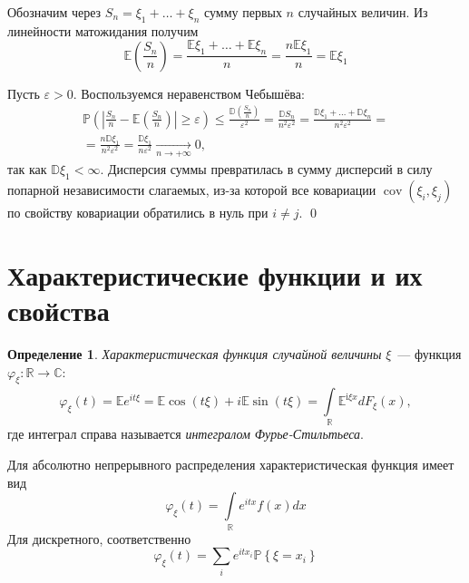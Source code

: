\documentclass[oneside,final,14pt]{extreport}
\renewenvironment{proof}{{\bfseries Доказательство.}}{\qed}
\theoremstyle{plain}
\theoremstyle{definition}
\newtheorem*{defn}{Определение}
\theoremstyle{named}
\begin{document}
\begin{proof}
    Обозначим через $S_n = \xi_1 + \ldots + \xi_n$ сумму первых $n$ случайных величин. Из линейности матожидания получим
    \begin{equation*}
        \mathbb{E}\left(\frac{S_{n}}{n}\right)=\frac{\mathbb{E} \xi_{1}+\ldots+\mathbb{E} \xi_{n}}{n}=\frac{n \mathbb{E} \xi_{1}}{n}=\mathbb{E} \xi_{1}
    \end{equation*}
    
    Пусть $\varepsilon > 0.$ Воспользуемся неравенством Чебышёва:
    \begin{multline*}
        \mathbb{P}\left(\left|\frac{S_{n}}{n}-\mathbb{E}\left(\frac{S_{n}}{n}\right)\right| \geqslant \varepsilon\right) \leqslant \frac{\mathbb{D}\left(\frac{S_{n}}{n}\right)}{\varepsilon^{2}}
        = \frac{\mathbb{D} S_{n}}{n^{2} \varepsilon^{2}}
        = \frac{\mathbb{D} \xi_{1}+\ldots+\mathbb{D} \xi_{n}}{n^{2} \varepsilon^{2}}= \\
        = \frac{n \mathbb{D} \xi_{1}}{n^{2} \varepsilon^{2}}
        = \frac{\mathbb{D} \xi_{1}}{n \varepsilon^{2}} \xrightarrow[n \to +\infty]{} 0,
    \end{multline*}
    так как $\mathbb{D}\xi_1 < \infty$. Дисперсия суммы превратилась в сумму дисперсий в силу попарной независимости слагаемых, из-за которой все ковариации $\operatorname{cov}(\xi_i, \xi_j)$ по свойству ковариации обратились в нуль при $i \neq j$.
\end{proof}

\section{Характеристические функции и их свойства}
\begin{defn}
    {\it Характеристическая функция случайной величины} $\xi$~--- функция $\varphi_{\xi}: \mathbb{R} \rightarrow \mathbb{C}$:
    \begin{equation*}
        \varphi_{\xi}(t)
        = \mathbb{E} e^{i t \xi}
        = \mathbb{E} \cos (t \xi)+i \mathbb{E} \sin (t \xi) = \int\limits_{\mathbb{R}}^{} \mathbb{E}^{\mathrm{i} \xi x} d F_{\xi}(x),
    \end{equation*}
    где интеграл справа называется {\it интегралом Фурье-Стильтьеса}.
    
    Для абсолютно непрерывного распределения характеристическая функция имеет вид
    \begin{equation*}
        \varphi_{\xi}(t)=\int\limits_{\mathbb{R}} e^{i t x} f(x) d x
    \end{equation*}
    Для дискретного, соответственно
    \begin{equation*}
        \varphi_{\xi}(t)=\sum\limits_{i} e^{i t x_{i}} \mathbb{P}\left\{\xi=x_{i}\right\}
    \end{equation*}
\end{defn}
\end{document}
